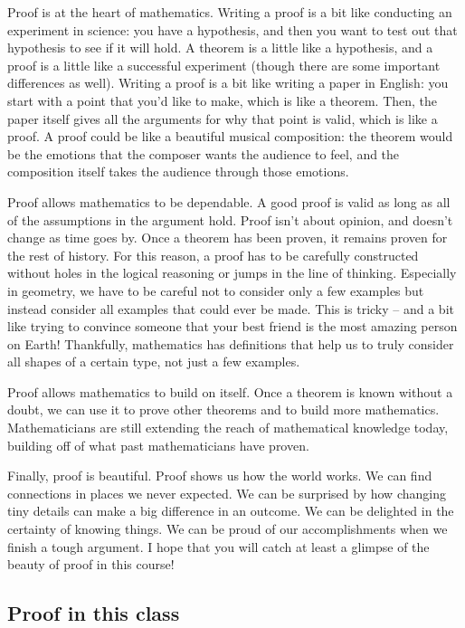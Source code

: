 \documentclass{ximera}
\begin{document}
Proof is at the heart of mathematics. Writing a proof is a bit like conducting an experiment in science: you have a hypothesis, and then you want to test out that hypothesis to see if it will hold. A theorem is a little like a hypothesis, and a proof is a little like a successful experiment (though there are some important differences as well). Writing a proof is a bit like writing a paper in English: you start with a point that you'd like to make, which is like a theorem. Then, the paper itself gives all the arguments for why that point is valid, which is like a proof. A proof could be like a beautiful musical composition: the theorem would be the emotions that the composer wants the audience to feel, and the composition itself takes the audience through those emotions.

 Proof allows mathematics to be dependable. A good proof is valid as long as all of the assumptions in the argument hold. Proof isn't about opinion, and doesn't change as time goes by. Once a theorem has been proven, it remains proven for the rest of history. For this reason, a proof has to be carefully constructed without holes in the logical reasoning or jumps in the line of thinking. Especially in geometry, we have to be careful not to consider only a few examples but instead consider all examples that could ever be made. This is tricky -- and a bit like trying to convince someone that your best friend is the most amazing person on Earth! Thankfully, mathematics has definitions that help us to truly consider all shapes of a certain type, not just a few examples.
 
 Proof allows mathematics to build on itself. Once a theorem is known without a doubt, we can use it to prove other theorems and to build more mathematics. Mathematicians are still extending the reach of mathematical knowledge today, building off of what past mathematicians have proven.
 
 Finally, proof is beautiful. Proof shows us how the world works. We can find connections in places we never expected. We can be surprised by how changing tiny details can make a big difference in an outcome. We can be delighted in the certainty of knowing things. We can be proud of our accomplishments when we finish a tough argument. I hope that you will catch at least a glimpse of the beauty of proof in this course!


\subsection{Proof in this class}
\end{document}
